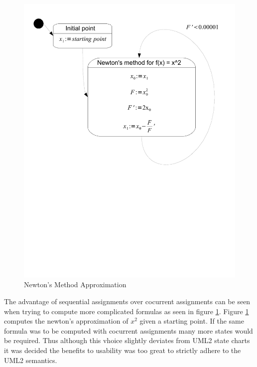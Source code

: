 \begin{figure}[htp]
    \centering
    \includegraphics[trim= 10mm 110mm 10mm 10mm, clip, width=\imgmedium]{./images/state_uml2_newtons.pdf}
    \caption{Newton's Method Approximation}
    \label{fig:state_uml2_newtons}
\end{figure}

The advantage of sequential assignments over cocurrent assignments can be seen when trying to compute more complicated formulas as seen in figure \ref{fig:state_uml2_newtons}. Figure \ref{fig:state_uml2_newtons} computes the newton's approximation of $x^2$ given a starting point. If the same formula was to be computed with cocurrent assignments many more states would be required. Thus although this vhoice slightly deviates from UML2 state charts it was decided the benefits to usability was too great to strictly adhere to the UML2 semantics.